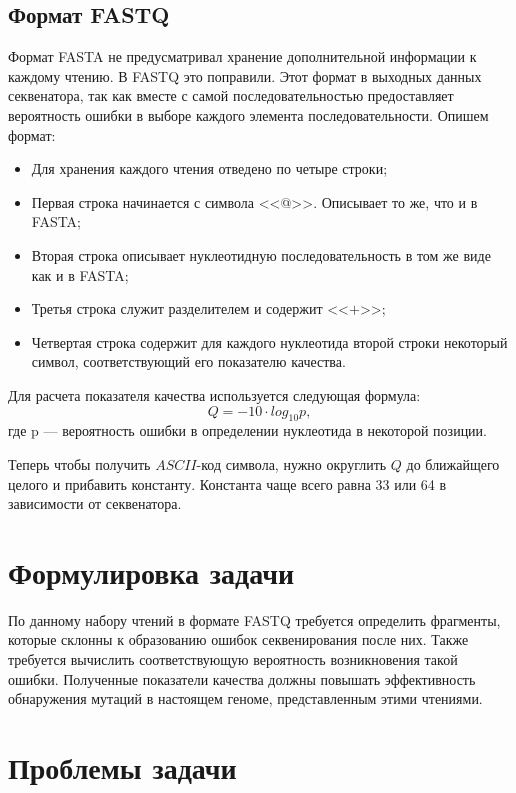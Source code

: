 \subsection{Формат FASTQ}
Формат FASTA не предусматривал хранение дополнительной информации к каждому чтению. В FASTQ это поправили.
Этот формат в выходных данных секвенатора, так как вместе с самой последовательностью предоставляет вероятность ошибки в выборе каждого элемента последовательности. Опишем формат:
\begin{itemize}
\item Для хранения каждого чтения отведено по четыре строки;
\item Первая строка начинается с символа <<@>>. Описывает то же, что и в FASTA;
\item Вторая строка описывает нуклеотидную последовательность в том же виде как и в FASTA;
\item Третья строка служит разделителем и содержит <<$+$>>;
\item Четвертая строка содержит для каждого нуклеотида второй строки некоторый символ, соответствующий его показателю качества. 
\end{itemize}

Для расчета показателя качества используется следующая формула:
	\begin{equation*}
	Q = -10 \cdot log_{10} p,
	\end{equation*}
где p — вероятность ошибки в определении нуклеотида в некоторой позиции. 

Теперь чтобы получить $ASCII$-код символа, нужно округлить $Q$ до ближайщего целого и прибавить константу.
Константа чаще всего равна 33 или 64 в зависимости от секвенатора.

\section{Формулировка задачи}
\label{Problem formulation}

По данному набору чтений в формате FASTQ требуется определить фрагменты, которые склонны к образованию ошибок секвенирования после них. Также требуется вычислить соответствующую вероятность возникновения такой ошибки. Полученные показатели качества должны повышать эффективность обнаружения мутаций в настоящем геноме, представленным этими чтениями.

\section{Проблемы задачи}


